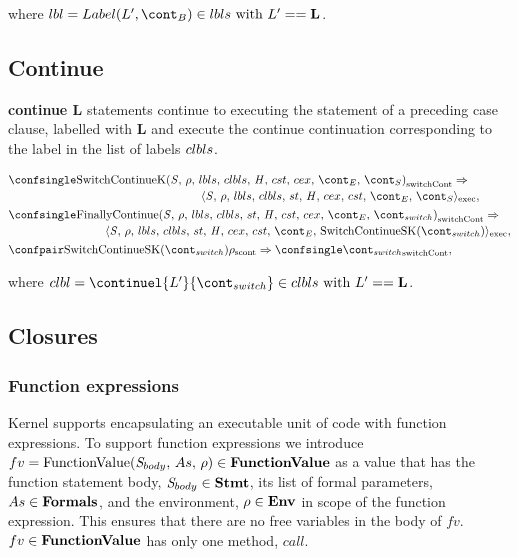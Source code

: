 \documentclass{article}
\newcommand{\cesktrans}[2]{\ensuremath{{#1} \Rightarrow {#2}}}
\newcommand{\cesktranssplit}[2]{\ensuremath{{#1} \Rightarrow\\ {#2}}}
\begin{document}
\noindent where $\lbl = Label(L', \bcont) \in \lbls \textrm{ with } L' == \mathbf{L}$.


\subsection{Continue}
\textbf{continue L} statements continue to executing the statement of a preceding case clause, labelled with \textbf{L} and execute the continue continuation corresponding to the label in the list of labels $clbls$.

\begin{align*}
    &\begin{multlined}
        \cesktranssplit%
            {\switchconf{\ContinueK}}%
            {\execconf{\stmt}{\env}{\lbls}{\clbls}{\handler}{\cex}{\cstrace}{\econt}{\scont}},
    \end{multlined}\\
    &\begin{multlined}
        \cesktranssplit%
            {\switchconf{\FinallyContinue{\stmt}{\switchcont}}}%
            {\execconf{\stmt}{\env}{\lbls}{\clbls}{\handler}{\cex}{\cstrace}{\econt}{\mathrm{SwitchContinueSK}(\switchcont)}},
    \end{multlined}\\
    &\cesktrans%
        {\scontconf{\mathrm{SwitchContinueSK}(\switchcont)}{\env}}%
        {\switchconf{\switchcont}},
\end{align*}

\noindent where $\clbl = \continuel{L'}{\switchcont} \in \clbls \textrm{ with } L' == \mathbf{L}$.


\subsection{Closures}
\subsubsection{Function expressions}

Kernel supports encapsulating an executable unit of code with function expressions.
To support function expressions we introduce $fv = \mathrm{FunctionValue}({\mathit{S}_{body}},\,{As},\,{\rho}) \in \mathbf{FunctionValue}$ as a value that has the function statement body, $\mathit{S}_{body} \in \mathbf{Stmt}$, its list of formal parameters, $As \in \mathbf{Formals}$, and the environment, $\rho \in \mathbf{Env}$ in scope of the function expression.
This ensures that there are no free variables in the body of $fv$.
$fv \in \mathbf{FunctionValue}$ has only one method, $call$.
\end{document}

